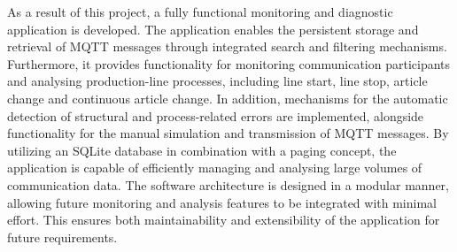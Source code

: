 As a result of this project, a fully functional monitoring and diagnostic application is developed. The application enables the persistent storage and retrieval of MQTT messages through integrated search and filtering mechanisms. Furthermore, it provides functionality for monitoring communication participants and analysing production-line processes, including line start, line stop, article change and continuous article change. In addition, mechanisms for the automatic detection of structural and process-related errors are implemented, alongside functionality for the manual simulation and transmission of MQTT messages. By utilizing an SQLite database in combination with a paging concept, the application is capable of efficiently managing and analysing large volumes of communication data. The software architecture is designed in a modular manner, allowing future monitoring and analysis features to be integrated with minimal effort. This ensures both maintainability and extensibility of the application for future requirements.

\clearpage